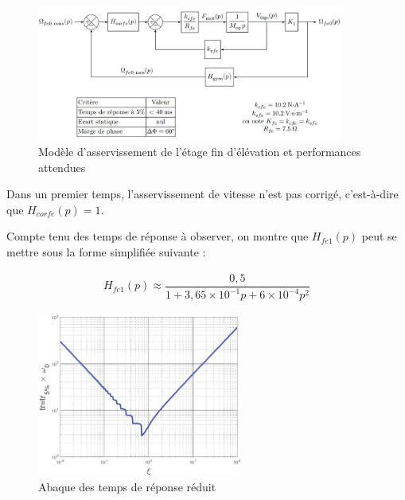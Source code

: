 \begin{figure}[!htb]
\begin{center}
\includegraphics[width=0.9\textwidth]{images/figure15.jpg}
\caption{Modèle d'asservissement de l'étage fin d'élévation et performances attendues \label{figure15}}
\end{center}
\end{figure}

Dans un premier temps, l'asservissement de vitesse n'est pas corrigé, c'est-à-dire que $H_{corfe}(p)=1$.


Compte tenu des temps de réponse à observer, on montre que $H_{fe1}(p)$ peut se mettre sous la forme simplifiée
suivante :

\begin{align*}
H_{fe1}(p)\approx\dfrac{0,5}{1+3,65\times 10^{-1}p+6\times 10^{-4}p^2}
\end{align*}


\begin{figure}[!htb]
\begin{center}
\includegraphics[width=0.6\textwidth]{images/amortissement.pdf}
\caption{Abaque des temps de réponse réduit\label{fig16}}
\end{center}
\end{figure}

